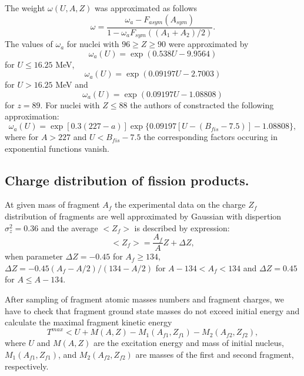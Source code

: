 The weight $\omega(U,A,Z)$ was approximated as follows
\begin{equation}
\label{FPS7} \omega = \frac{\omega_{a} - F_{asym}(A_{sym})}
{1 - \omega_a F_{sym}((A_1 + A_2)/2)}.
\end{equation}
The values of $\omega_a$ for nuclei with $96 \geq Z \geq 90$ were 
approximated by
\begin{equation}
\label{FPS8} \omega_a(U) = \exp{(0.538U - 9.9564)}
\end{equation}
for $U \leq 16.25$ MeV,
\begin{equation}
\label{FPS9} \omega_a(U) = \exp{(0.09197U - 2.7003)}
\end{equation}
for $U > 16.25$ MeV and 
\begin{equation}
\label{FPS10} \omega_a(U) = \exp{(0.09197U - 1.08808)}
\end{equation}
for $z = 89$. 
For nuclei with $Z \leq 88$ the authors of \cite{ABIM93} constracted 
the following approximation:
\begin{equation}
\label{FPS11}\omega_a(U) = 
\exp{[0.3(227 - a)]} \exp{ \{0.09197[U - (B_{fis} - 7.5)] 
- 1.08808 \}},
\end{equation}
where for $A > 227$ and $U < B_{fis} - 7.5$ the corresponding factors occuring
in exponential functions vanish.

\subsection{Charge distribution of fission products.}

\hspace{1.0em}At given mass of fragment $A_f$ the 
experimental data \cite{VH73} on the charge $Z_f$ distribution of
fragments are well approximated by Gaussian with dispertion
$\sigma^2_{z} = 0.36$ and the average $<Z_f>$ is described by
expression:
\begin{equation}
\label{FPS12} <Z_f> = \frac{A_f}{A}Z + \Delta Z, 
\end{equation}
when parameter $\Delta Z = -0.45$ for $A_f \geq 134$, $\Delta Z = -
0.45(A_f -A/2)/(134 - A/2)$ for $ A - 134 < A_f < 134$ and $\Delta Z =
0.45$ for $A \leq A - 134$.

After sampling of fragment atomic masses numbers and fragment charges, 
we have to check that fragment ground state masses do not exceed initial 
energy and calculate the maximal fragment kinetic energy 
\begin{equation}
\label{FPS13a}T^{max} < U + M(A,Z) - M_1(A_{f1}, Z_{f1}) - M_2(A_{f2}, Z_{f2}),
\end{equation}
where $U$ and $M(A,Z)$ are the excitation energy and mass of initial
nucleus,  $M_1(A_{f1},
Z_{f1})$,  and $M_2(A_{f2}, Z_{f2})$ are masses
of the first and second fragment, respectively.

